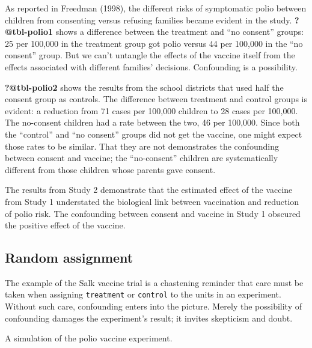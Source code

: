 \documentclass[
  letterpaper,
  DIV=11,
  numbers=noendperiod,
  oneside]{scrartcl}
\begin{document}
As reported in Freedman (1998), the different risks of symptomatic polio
between children from consenting versus refusing families became evident
in the study. \textbf{?@tbl-polio1} shows a difference between the
treatment and ``no consent'' groups: 25 per 100,000 in the treatment
group got polio versus 44 per 100,000 in the ``no consent'' group. But
we can't untangle the effects of the vaccine itself from the effects
associated with different families' decisions. Confounding is a
possibility.

\textbf{?@tbl-polio2} shows the results from the school districts that
used half the consent group as controls. The difference between
treatment and control groups is evident: a reduction from 71 cases per
100,000 children to 28 cases per 100,000. The no-consent children had a
rate between the two, 46 per 100,000. Since both the ``control'' and
``no consent'' groups did not get the vaccine, one might expect those
rates to be similar. That they are not demonstrates the confounding
between consent and vaccine; the ``no-consent'' children are
systematically different from those children whose parents gave consent.

The results from Study 2 demonstrate that the estimated effect of the
vaccine from Study 1 understated the biological link between vaccination
and reduction of polio risk. The confounding between consent and vaccine
in Study 1 obscured the positive effect of the vaccine.

\subsection{Random assignment}\label{random-assignment}

The example of the Salk vaccine trial is a chastening reminder that care
must be taken when assigning \texttt{treatment} or \texttt{control} to
the units in an experiment. Without such care, confounding enters into
the picture. Merely the possibility of confounding damages the
experiment's result; it invites skepticism and doubt.

\begin{marginfigure}


\caption{\label{fig-dag-polio}A simulation of the polio vaccine
experiment.}

\end{marginfigure}%
\end{document}
